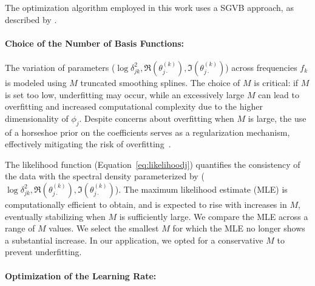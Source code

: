 \documentclass[%
 reprint,
 amsmath,amssymb,
 aps,
 nofootinbib,
]{revtex4-2}
\begin{document}
The optimization algorithm employed in this work uses a SGVB approach, as described by \citet{kingma2022,Xu2019,Domke2019}. 


 

\paragraph{Choice of the Number of Basis Functions:} 


The variation of parameters ($\log \delta^2_{jk},\Re(\theta^{(k)}_{j\cdot}),\Im(\theta^{(k)}_{j\cdot})$) across frequencies $f_k$ is modeled using $M$ truncated smoothing splines. 
The choice of $M$ is critical: if $M$ is set too low, underfitting may occur, while an excessively large $M$ can lead to overfitting and increased computational complexity due to the higher dimensionality of $\phi_j$. Despite concerns about overfitting when $M$ is large, the use of a horseshoe prior on the coefficients serves as a regularization mechanism, effectively mitigating the risk of overfitting~\citep{10.1214/17-EJS1337SI}.

The likelihood function (Equation~\ref{eq:likelihoodj}) quantifies the consistency of the data with the spectral density parameterized by ($\log \delta^2_{jk},\Re(\theta^{(k)}_{j\cdot}),\Im(\theta^{(k)}_{j\cdot})$). 
The maximum likelihood estimate (MLE) is computationally efficient to obtain, and is expected to rise with increases in $M$, eventually stabilizing when $M$ is sufficiently large. 
We compare the MLE across a range of $M$ values. 
We select the smallest $M$ for which the MLE no longer shows a substantial increase. 
In our application, we opted for a conservative $M$ to prevent underfitting.



\paragraph{Optimization of the Learning Rate:}\label{subsec:learningrate}
\end{document}

